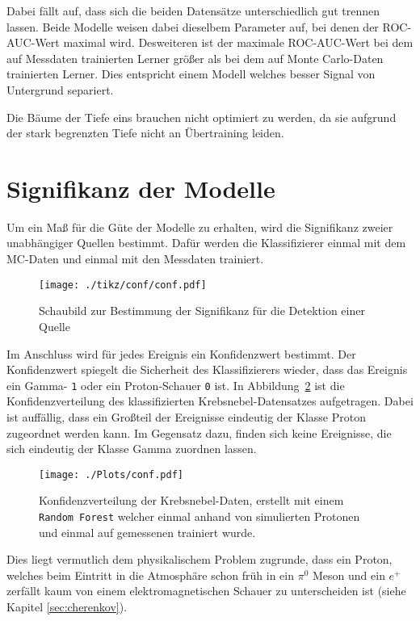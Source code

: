 Dabei fällt auf, dass sich die beiden Datensätze unterschiedlich gut trennen lassen.
Beide Modelle weisen dabei dieselbem Parameter auf, bei denen der ROC-AUC-Wert maximal wird.
Desweiteren ist der maximale ROC-AUC-Wert bei dem auf Messdaten trainierten Lerner größer als bei dem auf Monte Carlo-Daten trainierten Lerner.
Dies entspricht einem Modell welches besser Signal von Untergrund separiert.

Die Bäume der Tiefe eins brauchen nicht optimiert zu werden, da sie aufgrund der stark begrenzten Tiefe nicht an Übertraining leiden.

\section{Signifikanz der Modelle}
Um ein Maß für die Güte der Modelle zu erhalten, wird die Signifikanz zweier unabhängiger Quellen bestimmt. 
Dafür werden die Klassifizierer einmal mit dem MC-Daten und einmal mit den Messdaten trainiert. 
\begin{figure}[H]
  \centering
  \texttt{[image: ./tikz/conf/conf.pdf]}
  \caption{Schaubild zur Bestimmung der Signifikanz für die Detektion einer Quelle}
  \label{fig:<+label+>}
\end{figure}
Im Anschluss wird für jedes Ereignis ein Konfidenzwert bestimmt. 
Der Konfidenzwert spiegelt die Sicherheit des Klassifizierers wieder, dass das Ereignis ein Gamma- \texttt{1} oder ein Proton-Schauer \texttt{0} ist. 
In Abbildung~\ref{fig:confdist} ist die Konfidenzverteilung des klassifizierten Krebsnebel-Datensatzes aufgetragen. 
Dabei ist auffällig, dass ein Großteil der Ereignisse eindeutig der Klasse Proton zugeordnet werden kann. 
Im Gegensatz dazu, finden sich keine Ereignisse, die sich eindeutig der Klasse Gamma zuordnen lassen.
\begin{figure}[H]
  \centering
  \texttt{[image: ./Plots/conf.pdf]}
  \caption{Konfidenzverteilung der Krebsnebel-Daten, erstellt mit einem \texttt{Random Forest} welcher einmal anhand von simulierten Protonen und einmal auf gemessenen trainiert wurde.}
  \label{fig:confdist}
\end{figure}
Dies liegt vermutlich dem physikalischem Problem zugrunde, dass ein Proton, welches beim Eintritt in die Atmosphäre schon früh in ein $\pi^{0}$ Meson und ein $e^{+}$ zerfällt kaum von einem elektromagnetischen Schauer zu unterscheiden ist (siehe Kapitel \ref{sec:cherenkov}).

